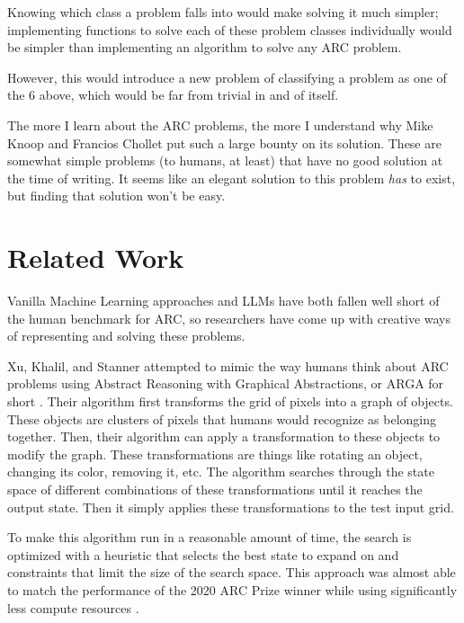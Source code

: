 \documentclass[letterpaper]{article} %
\begin{document}
Knowing which class a problem falls into would make solving it much simpler; implementing functions to solve each of these problem classes individually would be simpler than implementing an algorithm to solve any ARC problem.

However, this would introduce a new problem of classifying a problem as one of the 6 above, which would be far from trivial in and of itself.

\bigskip

The more I learn about the ARC problems, the more I understand why Mike Knoop and Francios Chollet put such a large bounty on its solution. These are somewhat simple problems (to humans, at least) that have no good solution at the time of writing. It seems like an elegant solution to this problem \textit{has} to exist, but finding that solution won't be easy.

\section{Related Work}
Vanilla Machine Learning approaches and LLMs have both fallen well short of the human benchmark for ARC, so researchers have come up with creative ways of representing and solving these problems.

\bigskip

Xu, Khalil, and Stanner attempted to mimic the way humans think about ARC problems using Abstract Reasoning with Graphical Abstractions, or ARGA for short \cite{Xu_Khalil_Sanner_2023}. Their algorithm first transforms the grid of pixels into a graph of objects. These objects are clusters of pixels that humans would recognize as belonging together. Then, their algorithm can apply a transformation to these objects to modify the graph. These transformations are things like rotating an object, changing its color, removing it, etc. The algorithm searches through the state space of different combinations of these transformations until it reaches the output state. Then it simply applies these transformations to the test input grid.

To make this algorithm run in a reasonable amount of time, the search is optimized with a heuristic that selects the best state to expand on and constraints that limit the size of the search space. This approach was almost able to match the performance of the 2020 ARC Prize winner while using significantly less compute resources \cite{Xu_Khalil_Sanner_2023}.

\bigskip
\end{document}
